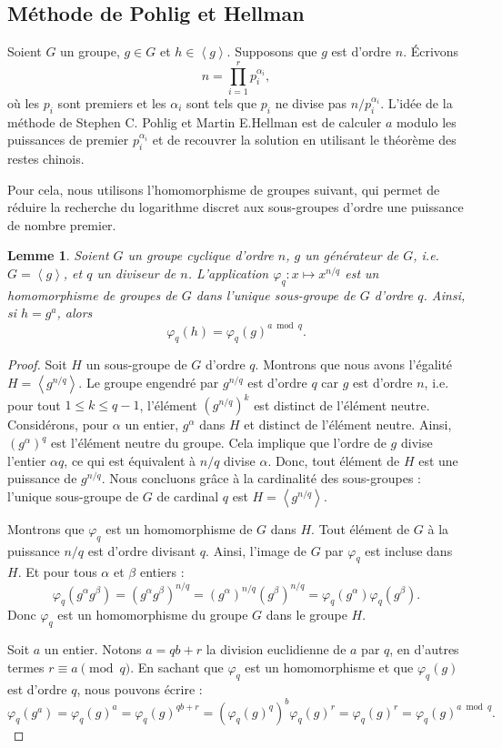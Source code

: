 \documentclass[a4paper, titlepage]{article}
\newtheorem{lemm}[theo]{Lemme}
\theoremstyle{definition}
\theoremstyle{remark}
\def\gen #1{\left\langle#1\right\rangle}
\begin{document}
\subsection{Méthode de Pohlig et Hellman}

Soient $G$ un groupe, $g\in G$ et $h \in \gen{g}$. Supposons que $g$ est d'ordre $n$. \'Ecrivons $$n = \prod_{i=1}^r p_i^{\alpha_i},$$
où les $p_i$ sont premiers et les $\alpha_i$ sont tels que $p_i$ ne divise pas $n/p_i^{\alpha_i}$.
L'idée de la méthode de Stephen C. Pohlig et Martin E.Hellman \cite{pohligHellman1978} est de calculer $a$ modulo les puissances de premier $p_i^{\alpha_i}$ et de recouvrer la solution en utilisant le théorème des restes chinois.

Pour cela, nous utilisons l'homomorphisme de groupes suivant, qui permet de réduire la recherche du logarithme discret aux sous-groupes d'ordre une puissance de nombre premier.

\begin{lemm}
Soient $G$ un groupe cyclique d'ordre $n$, $g$ un générateur de $G$, i.e. $G = \gen{g}$, et $q$ un diviseur de $n$. L'application $\varphi_q : x \mapsto x^{n/q}$ est un homomorphisme de groupes de $G$ dans l'unique sous-groupe de $G$ d'ordre $q$. Ainsi, si $h = g^a$, alors $$\varphi_q(h) = \varphi_q(g)^{a \bmod{q}}.$$
\end{lemm}

\begin{proof}
Soit $H$ un sous-groupe de $G$ d'ordre $q$. Montrons que nous avons l'égalité $H = \gen{g^{n/q}}$. Le groupe engendré par $g^{n/q}$ est d'ordre $q$ car $g$ est d'ordre $n$, i.e. pour tout $1 \leqslant k \leqslant q-1$, l'élément $(g^{n/q})^k$ est distinct de l'élément neutre.
Considérons, pour $\alpha$ un entier, $g^\alpha$ dans $H$ et distinct de l'élément neutre. Ainsi, $(g^\alpha)^{q}$ est l'élément neutre du groupe. Cela implique que l'ordre de $g$ divise l'entier $\alpha q$, ce qui est équivalent à $n/q$ divise $\alpha$. Donc, tout élément de $H$ est une puissance de $g^{n/q}$. Nous concluons grâce à la cardinalité des sous-groupes : l'unique sous-groupe de $G$ de cardinal $q$ est $H = \gen{g^{n/q}}$.

Montrons que $\varphi_q$ est un homomorphisme de $G$ dans $H$. Tout élément de $G$ à la puissance $n/q$ est d'ordre divisant $q$. Ainsi, l'image de $G$ par $\varphi_q$ est incluse dans $H$. Et pour tous $\alpha$ et $\beta$ entiers :
$$\varphi_q(g^\alpha g^\beta ) = \left(g^\alpha g^\beta \right)^{n/q} = \left(g^\alpha \right)^{n/q}\left(g^\beta \right)^{n/q} = \varphi_q(g^\alpha )\varphi_q(g^\beta ).$$
Donc $\varphi_q$ est un homomorphisme du groupe $G$ dans le groupe $H$.

Soit $a$ un entier. Notons $a = qb + r$ la division euclidienne de $a$ par $q$, en d'autres termes $r \equiv a \pmod{q}$. En sachant que $\varphi_q$ est un homomorphisme et que $\varphi_q(g)$ est d'ordre $q$, nous pouvons écrire :
$$\varphi_q(g^a) = \varphi_q(g)^a = \varphi_q(g)^{qb + r} = \left({\varphi_q(g)^{q}}\right)^{b}\varphi_q(g)^{r} =\varphi_q(g)^{r} = \varphi_q(g)^{a \bmod{q}}.$$
\end{proof}
\end{document}
